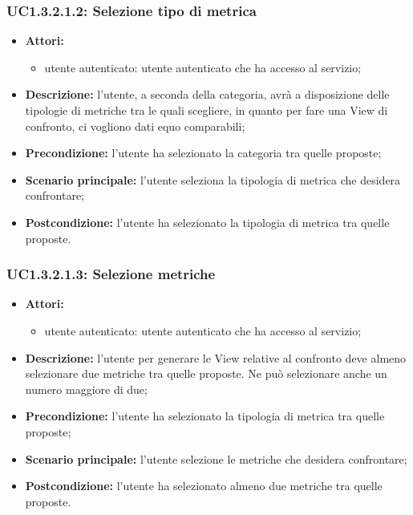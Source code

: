 \subsubsection{UC1.3.2.1.2: Selezione tipo di metrica}
\begin{itemize}
	\item \textbf{Attori:}
	\begin{itemize}
		\item utente autenticato: utente autenticato che ha accesso al servizio;
	\end{itemize}
	\item \textbf{Descrizione:} l'utente, a seconda della categoria, avrà a disposizione delle tipologie di metriche tra le quali scegliere, in quanto per fare una View di confronto, ci vogliono dati equo comparabili;
	\item \textbf{Precondizione:} l'utente ha selezionato la categoria tra quelle proposte;
	\item \textbf{Scenario principale:} l'utente seleziona la tipologia di metrica che desidera confrontare;
	\item \textbf{Postcondizione:} l'utente ha selezionato la tipologia di metrica tra quelle proposte.
\end{itemize}

\subsubsection{UC1.3.2.1.3: Selezione metriche}
\begin{itemize}
	\item \textbf{Attori:}
	\begin{itemize}
		\item utente autenticato: utente autenticato che ha accesso al servizio;
	\end{itemize}
	\item \textbf{Descrizione:} l'utente per generare le View relative al confronto deve almeno selezionare due metriche tra quelle proposte. Ne può selezionare anche un numero maggiore di due;
	\item \textbf{Precondizione:} l'utente ha selezionato la tipologia di metrica tra quelle proposte;
	\item \textbf{Scenario principale:} l'utente selezione le metriche che desidera confrontare;
	\item \textbf{Postcondizione:} l'utente ha selezionato almeno due metriche tra quelle proposte.
\end{itemize}


